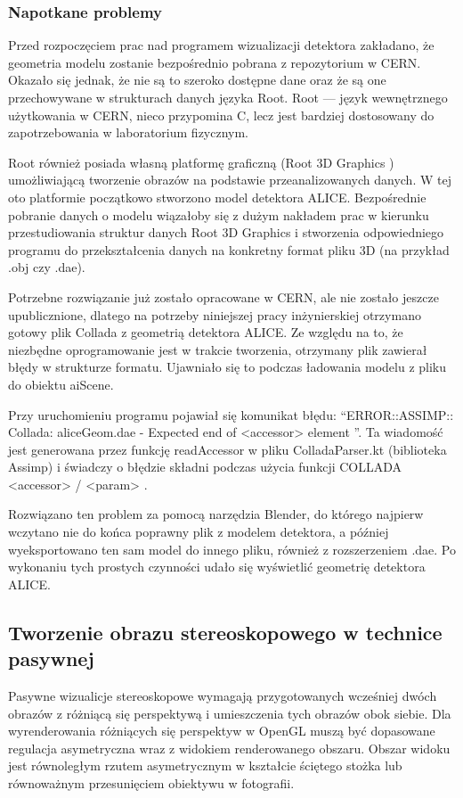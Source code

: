 \subsubsection{Napotkane problemy}
Przed rozpoczęciem prac nad programem wizualizacji detektora zakładano, że geometria modelu zostanie bezpośrednio pobrana z repozytorium w CERN. Okazało się jednak, że nie są to szeroko dostępne dane oraz że są one przechowywane w strukturach danych języka Root. Root --- język wewnętrznego użytkowania w CERN, nieco przypomina C, lecz jest bardziej dostosowany do zapotrzebowania w laboratorium fizycznym.

Root również posiada własną platformę graficzną (Root 3D Graphics \cite{root3dGraphics}) umożliwiającą tworzenie obrazów na podstawie przeanalizowanych danych. W tej oto platformie początkowo stworzono model detektora ALICE. Bezpośrednie pobranie danych o modelu wiązałoby się z dużym nakładem prac w kierunku przestudiowania struktur danych Root 3D Graphics i stworzenia odpowiedniego programu do przekształcenia danych na konkretny format pliku 3D (na przykład .obj czy .dae). 

Potrzebne rozwiązanie już zostało opracowane w CERN, ale nie zostało jeszcze upublicznione, dlatego na potrzeby niniejszej pracy inżynierskiej otrzymano gotowy plik Collada z geometrią detektora ALICE. Ze względu na to, że niezbędne oprogramowanie jest w trakcie tworzenia, otrzymany plik zawierał błędy w strukturze formatu. Ujawniało się to podczas ładowania modelu z pliku do obiektu aiScene. 

Przy uruchomieniu programu pojawiał się komunikat błędu: \textquotedblleft ERROR::ASSIMP:: Collada: aliceGeom.dae - Expected end of <accessor> element \textquotedblright . Ta wiadomość jest generowana przez funkcję readAccessor w pliku ColladaParser.kt (biblioteka Assimp) i świadczy o błędzie składni podczas użycia funkcji COLLADA <accessor> / <param> \cite{collada}.

Rozwiązano ten problem za pomocą narzędzia Blender, do którego najpierw wczytano nie do końca poprawny plik z modelem detektora, a później wyeksportowano ten sam model do innego pliku, również z rozszerzeniem .dae. Po wykonaniu tych prostych czynności udało się wyświetlić geometrię detektora ALICE. 
\newpage
\subsection{Tworzenie obrazu stereoskopowego w technice pasywnej}
Pasywne wizualicje stereoskopowe wymagają przygotowanych wcześniej dwóch obrazów z różniącą się perspektywą i umieszczenia tych obrazów obok siebie. Dla wyrenderowania różniących się perspektyw w OpenGL muszą być dopasowane regulacja asymetryczna wraz z widokiem renderowanego obszaru. Obszar widoku jest równoległym rzutem asymetrycznym w kształcie ściętego stożka lub równoważnym przesunięciem obiektywu w fotografii. 

